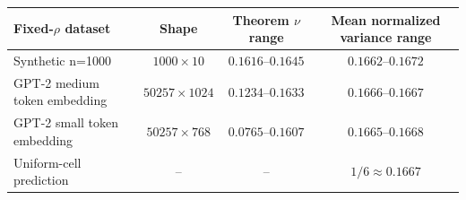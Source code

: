 \begin{tabular}{lccc}
\toprule
Fixed-$\rho$ dataset & Shape & Theorem $\nu$ range & Mean normalized variance range \\
\midrule
Synthetic n=1000 & $1000\times 10$ & $0.1616$--$0.1645$ & $0.1662$--$0.1672$ \\
GPT-2 medium token embedding & $50257\times 1024$ & $0.1234$--$0.1633$ & $0.1666$--$0.1667$ \\
GPT-2 small token embedding & $50257\times 768$ & $0.0765$--$0.1607$ & $0.1665$--$0.1668$ \\
\midrule
Uniform-cell prediction & -- & -- & $1/6 \approx 0.1667$ \\
\bottomrule
\end{tabular}
